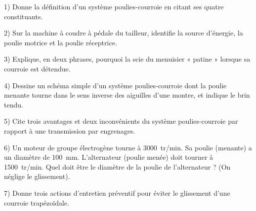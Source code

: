 \documentclass[11pt]{article}
\begin{document}
\begin{exercice}
1) Donne la définition d'un système poulies-courroie en citant ses quatre constituants.

2) Sur la machine à coudre à pédale du tailleur, identifie la source d'énergie, la poulie motrice et la poulie réceptrice.

3) Explique, en deux phrases, pourquoi la scie du menuisier « patine » lorsque sa courroie est détendue.

4) Dessine un schéma simple d'un système poulies-courroie dont la poulie menante tourne dans le sens inverse des aiguilles d'une montre, et indique le brin tendu.

5) Cite trois avantages et deux inconvénients du système poulies-courroie par rapport à une transmission par engrenages.

6) Un moteur de groupe électrogène tourne à \SI{3000}{tr/min}. Sa poulie (menante) a un diamètre de \SI{100}{mm}. L'alternateur (poulie menée) doit tourner à \SI{1500}{tr/min}. Quel doit être le diamètre de la poulie de l'alternateur ? (On néglige le glissement).

7) Donne trois actions d'entretien préventif pour éviter le glissement d'une courroie trapézoïdale.
\end{exercice}
\end{document}

